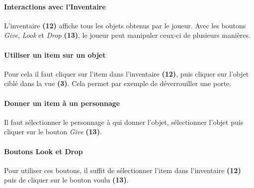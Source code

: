 \documentclass[./standalone.tex]{subfiles}
\begin{document}
\paragraph{Interactions avec l’Inventaire\\}
    L’inventaire \textbf{(12)} affiche tous les objets obtenus par le joueur. Avec les boutons \textit{Give}, \textit{Look} et \textit{Drop} \textbf{(13)}, le joueur peut manipuler ceux-ci de plusieurs manières.

\paragraph{Utiliser un item sur un objet\\}
	Pour cela il faut cliquer sur l’item dans l’inventaire \textbf{(12)}, puis cliquer sur l’objet ciblé dans la vue \textbf{(3)}. Cela permet par exemple de déverrouiller une porte.
        
\paragraph{Donner un item à un personnage\\}
    Il faut sélectionner le personnage à qui donner l’objet, sélectionner l’objet puis cliquer sur le bouton \textit{Give} \textbf{(13)}.
        
\paragraph{Boutons Look et Drop\\}
    Pour utiliser ces boutons, il suffit de sélectionner l’item dans l’inventaire \textbf{(12)} puis de cliquer sur le bouton voulu \textbf{(13)}.
\newpage
    
\end{document}

